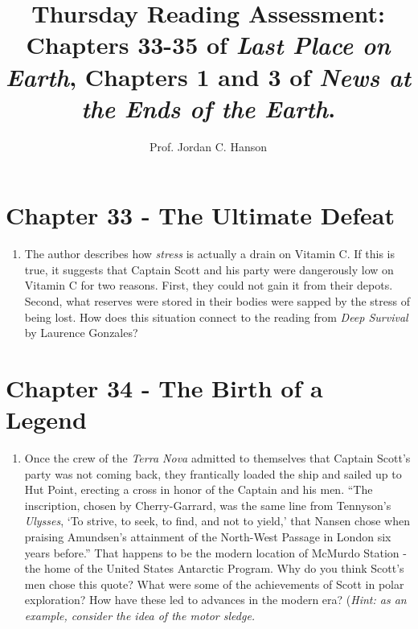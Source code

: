 \documentclass{article}
\begin{document}
\title{Thursday Reading Assessment: Chapters 33-35 of \textit{Last Place on Earth}, Chapters 1 and 3 of \textit{News at the Ends of the Earth}.}
\author{Prof. Jordan C. Hanson}

\maketitle

\section{Chapter 33 - The Ultimate Defeat}

\begin{enumerate}
\item The author describes how \textit{stress} is actually a drain on Vitamin C.  If this is true, it suggests that Captain Scott and his party were dangerously low on Vitamin C for two reasons.  First, they could not gain it from their depots.  Second, what reserves were stored in their bodies were sapped by the stress of being lost.  How does this situation connect to the reading from \textit{Deep Survival} by Laurence Gonzales? \\ \vspace{2cm}
\end{enumerate}

\section{Chapter 34 - The Birth of a Legend}

\begin{enumerate}
\item Once the crew of the \textit{Terra Nova} admitted to themselves that Captain Scott's party was not coming back, they frantically loaded the ship and sailed up to Hut Point, erecting a cross in honor of the Captain and his men.  ``The inscription, chosen by Cherry-Garrard, was the same line from Tennyson's \textit{Ulysses}, `To strive, to seek, to find, and not to yield,' that Nansen chose when praising Amundsen's attainment of the North-West Passage in London six years before.''  That happens to be the modern location of McMurdo Station - the home of the United States Antarctic Program.  Why do you think Scott's men chose this quote?  What were some of the achievements of Scott in polar exploration?  How have these led to advances in the modern era?  (\textit{Hint: as an example, consider the idea of the motor sledge.} \\ \vspace{2cm}
\end{enumerate}
\end{document}
